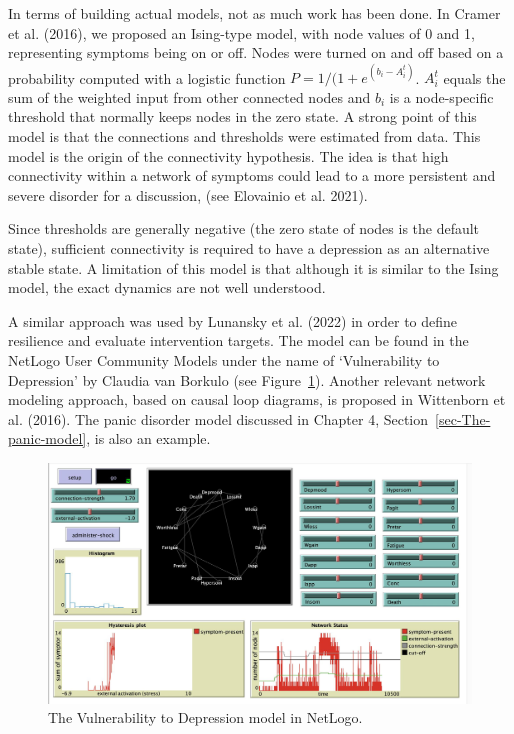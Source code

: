 \documentclass[
  a4paper,
  DIV=11,
  numbers=noendperiod]{scrreprt}
\begin{document}
In terms of building actual models, not as much work has been done. In
Cramer et al. (2016), we proposed an Ising-type model, with node values
of 0 and 1, representing symptoms being on or off. Nodes were turned on
and off based on a probability computed with a logistic function
\(P = 1/(1 + e^{(b_{i} - A_{i}^{t})}\). \(A_{i}^{t}\) equals the sum of
the weighted input from other connected nodes and \(b_{i}\) is a
node-specific threshold that normally keeps nodes in the zero state. A
strong point of this model is that the connections and thresholds were
estimated from data. This model is the origin of the connectivity
hypothesis. The idea is that high connectivity within a network of
symptoms could lead to a more persistent and severe disorder for a
discussion, (see Elovainio et al. 2021).

Since thresholds are generally negative (the zero state of nodes is the
default state), sufficient connectivity is required to have a depression
as an alternative stable state. A limitation of this model is that
although it is similar to the Ising model, the exact dynamics are not
well understood.

A similar approach was used by Lunansky et al. (2022) in order to define
resilience and evaluate intervention targets. The model can be found in
the NetLogo User Community Models under the name of `Vulnerability to
Depression' by Claudia van Borkulo (see
Figure~\ref{fig-ch6-img9-old-78}). Another relevant network modeling
approach, based on causal loop diagrams, is proposed in Wittenborn et
al. (2016). The panic disorder model discussed in Chapter 4,
Section~\ref{sec-The-panic-model}, is also an example.

\begin{figure}

{\centering \includegraphics{media/ch6/image9.jpg}

}

\caption{\label{fig-ch6-img9-old-78}The Vulnerability to Depression
model in NetLogo.}

\end{figure}
\end{document}
